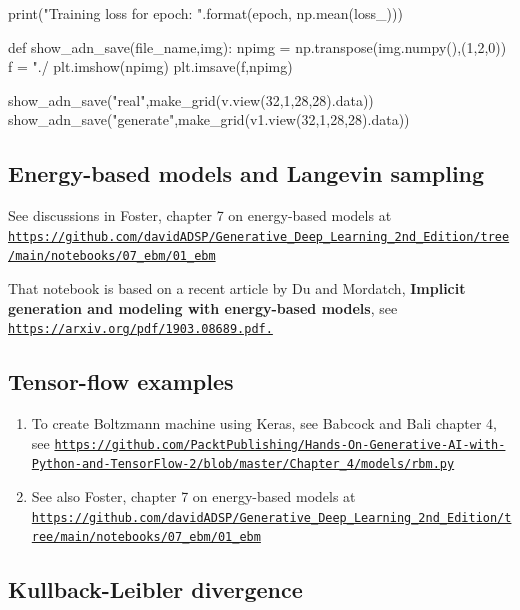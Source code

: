 \documentclass[%
oneside,                 %
final,                   %
10pt]{article}
\begin{document}
    print("Training loss for {} epoch: {}".format(epoch, np.mean(loss_)))


def show_adn_save(file_name,img):
    npimg = np.transpose(img.numpy(),(1,2,0))
    f = "./%
    plt.imshow(npimg)
    plt.imsave(f,npimg)

show_adn_save("real",make_grid(v.view(32,1,28,28).data))
show_adn_save("generate",make_grid(v1.view(32,1,28,28).data))


\epycod


\subsection{Energy-based models and Langevin sampling}

See discussions in Foster, chapter 7 on energy-based models at \href{{https://github.com/davidADSP/Generative_Deep_Learning_2nd_Edition/tree/main/notebooks/07_ebm/01_ebm}}{\nolinkurl{https://github.com/davidADSP/Generative_Deep_Learning_2nd_Edition/tree/main/notebooks/07_ebm/01_ebm}}

That notebook is based on a recent article by Du and Mordatch, \textbf{Implicit generation and modeling with energy-based models}, see \href{{https://arxiv.org/pdf/1903.08689.pdf.}}{\nolinkurl{https://arxiv.org/pdf/1903.08689.pdf.}}

\subsection{Tensor-flow examples}

\begin{enumerate}
\item To create Boltzmann machine using Keras, see Babcock and Bali chapter 4, see \href{{https://github.com/PacktPublishing/Hands-On-Generative-AI-with-Python-and-TensorFlow-2/blob/master/Chapter_4/models/rbm.py}}{\nolinkurl{https://github.com/PacktPublishing/Hands-On-Generative-AI-with-Python-and-TensorFlow-2/blob/master/Chapter_4/models/rbm.py}}

\item See also Foster, chapter 7 on energy-based models at \href{{https://github.com/davidADSP/Generative_Deep_Learning_2nd_Edition/tree/main/notebooks/07_ebm/01_ebm}}{\nolinkurl{https://github.com/davidADSP/Generative_Deep_Learning_2nd_Edition/tree/main/notebooks/07_ebm/01_ebm}}
\end{enumerate}

\noindent
\subsection{Kullback-Leibler divergence}
\end{document}
